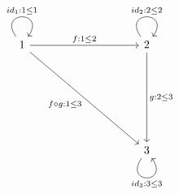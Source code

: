 \documentclass{article}
\begin{document}
\[\begin{tikzcd}
	1 &&&& 2 \\
	\\
	&&&&&&& {} \\
	\\
	&&&& 3
	\arrow["{id_1 : 1 \leq 1}", from=1-1, to=1-1, loop, in=55, out=125, distance=10mm]
	\arrow["{f : 1 \leq 2}", from=1-1, to=1-5]
	\arrow["{f \circ g : 1 \leq 3}"', from=1-1, to=5-5]
	\arrow["{id_2 : 2 \leq 2}", from=1-5, to=1-5, loop, in=55, out=125, distance=10mm]
	\arrow["{g : 2 \leq 3}", from=1-5, to=5-5]
	\arrow["{id_3 : 3 \leq 3}"', from=5-5, to=5-5, loop, in=305, out=235, distance=10mm]
\end{tikzcd}\]
\end{document}
